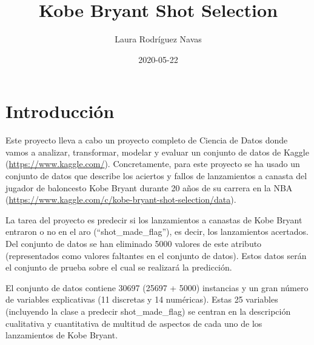 \documentclass[
]{article}
\title{\textbf{Kobe Bryant Shot Selection}}
\author{Laura Rodríguez Navas}
\date{2020-05-22}
\begin{document}
\maketitle

\hypertarget{introducciuxf3n}{%
\section{\texorpdfstring{\textbf{Introducción}}{Introducción}}\label{introducciuxf3n}}

Este proyecto lleva a cabo un proyecto completo de Ciencia de Datos
donde vamos a analizar, transformar, modelar y evaluar un conjunto de
datos de Kaggle (\url{https://www.kaggle.com/}). Concretamente, para
este proyecto se ha usado un conjunto de datos que describe los aciertos
y fallos de lanzamientos a canasta del jugador de baloncesto Kobe Bryant
durante 20 años de su carrera en la NBA
(\url{https://www.kaggle.com/c/kobe-bryant-shot-selection/data}).

La tarea del proyecto es predecir si los lanzamientos a canastas de Kobe
Bryant entraron o no en el aro (``shot\_made\_flag''), es decir, los
lanzamientos acertados. Del conjunto de datos se han eliminado 5000
valores de este atributo (representados como valores faltantes en el
conjunto de datos). Estos datos serán el conjunto de prueba sobre el
cual se realizará la predicción.

El conjunto de datos contiene 30697 (25697 + 5000) instancias y un gran
número de variables explicativas (11 discretas y 14 numéricas). Estas 25
variables (incluyendo la clase a predecir shot\_made\_flag) se centran
en la descripción cualitativa y cuantitativa de multitud de aspectos de
cada uno de los lanzamientos de Kobe Bryant.
\end{document}
